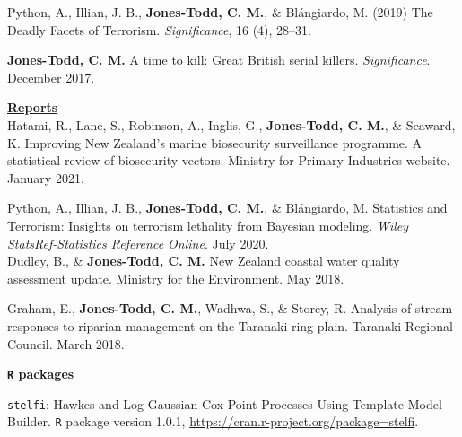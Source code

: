 \documentclass[10pt,a4paper]{moderncv}
\begin{document}
Python, A.,  Illian, J. B., \textbf{Jones-Todd, C. M.}, \& Bl\'{a}ngiardo, M. (2019) The Deadly Facets of Terrorism. \textit{Significance}, 16 (4), 28--31.\\

\vspace{-3pt}

\textbf{Jones-Todd, C. M.} A time to kill: Great British serial killers. \textit{Significance}. December 2017.\\

\vspace{2pt} 

\underline{\textbf{Reports}}\\

Hatami, R., Lane, S., Robinson, A.,  Inglis, G.,  \textbf{Jones-Todd, C. M.}, \& Seaward, K. Improving New Zealand’s marine biosecurity surveillance programme. A statistical review of biosecurity vectors.  Ministry for Primary Industries website. January 2021.\\

\vspace{-3pt}

Python, A.,  Illian, J. B., \textbf{Jones-Todd, C. M.}, \& Bl\'{a}ngiardo, M. Statistics and Terrorism: Insights on terrorism lethality from Bayesian modeling. \textit{Wiley StatsRef-Statistics Reference Online}. July 2020.\\

Dudley, B., \& \textbf{Jones-Todd, C. M.} New Zealand coastal water quality assessment update. Ministry for the Environment. May 2018.\\

\vspace{-3pt}

Graham, E., \textbf{Jones-Todd, C. M.}, Wadhwa, S., \& Storey, R. Analysis of stream responses to riparian management on the Taranaki ring plain. Taranaki Regional Council. March 2018.\\

\vspace{2pt}

\underline{\textbf{\texttt{R} packages}}\\
\vspace{-3pt}

\texttt{stelfi}: Hawkes and Log-Gaussian Cox Point Processes Using Template Model Builder. \texttt{R} package version 1.0.1, \url{https://cran.r-project.org/package=stelfi}.\\

\vspace{-3pt}
\end{document}
